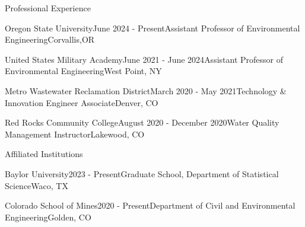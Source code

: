 \documentclass{resume} %
\begin{document}
\begin{rSection}{Professional Experience}

\begin{rSubsection}{Oregon State University}{June 2024 - Present}{Assistant Professor of Environmental Engineering}{Corvallis,OR}
\end{rSubsection}


\begin{rSubsection}{United States Military Academy}{June 2021 - June 2024}{Assistant Professor of Environmental Engineering}{West Point, NY}
\end{rSubsection}


\begin{rSubsection}{Metro Wastewater Reclamation District}{March 2020 - May 2021}{Technology \& Innovation Engineer Associate}{Denver, CO}
\end{rSubsection}


\begin{rSubsection}{Red Rocks Community College}{August 2020 - December 2020}{Water Quality Management Instructor}{Lakewood, CO}
\end{rSubsection}



\sectionskip
%

\begin{rSection}{Affiliated Institutions}

\begin{rSubsection}{Baylor University}{2023 - Present}{Graduate School, Department of Statistical Science}{Waco, TX}
\end{rSubsection}

\begin{rSubsection}{Colorado School of Mines}{2020 - Present}{Department of Civil and Environmental Engineering}{Golden, CO}
\end{rSubsection}

\end{rSection}

\sectionskip

\sectionskip





\end{rSection}
\end{document}
